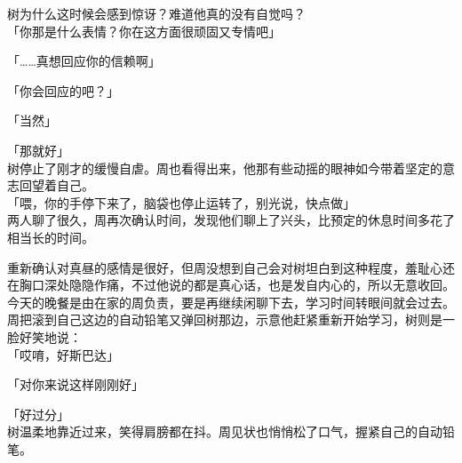 树为什么这时候会感到惊讶？难道他真的没有自觉吗？\\

「你那是什么表情？你在这方面很顽固又专情吧」

「……真想回应你的信赖啊」

「你会回应的吧？」

「当然」

「那就好」\\

树停止了刚才的缓慢自虐。周也看得出来，他那有些动摇的眼神如今带着坚定的意志回望着自己。\\

「喂，你的手停下来了，脑袋也停止运转了，别光说，快点做」\\

两人聊了很久，周再次确认时间，发现他们聊上了兴头，比预定的休息时间多花了相当长的时间。

重新确认对真昼的感情是很好，但周没想到自己会对树坦白到这种程度，羞耻心还在胸口深处隐隐作痛，不过他说的都是真心话，也是发自内心的，所以无意收回。\\

今天的晚餐是由在家的周负责，要是再继续闲聊下去，学习时间转眼间就会过去。\\

周把滚到自己这边的自动铅笔又弹回树那边，示意他赶紧重新开始学习，树则是一脸好笑地说：\\

「哎唷，好斯巴达」

「对你来说这样刚刚好」

「好过分」\\

树温柔地靠近过来，笑得肩膀都在抖。周见状也悄悄松了口气，握紧自己的自动铅笔。
